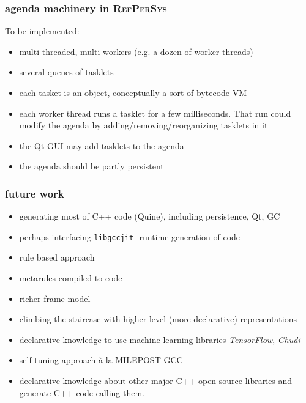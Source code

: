 \documentclass[xcolor=svgnames,final,smaller,a4]{beamer}
\newcommand{\RefPerSys}{\href{http://refpersys.org}{\textsc{RefPerSys}}}
\begin{document}
  \begin{frame}
    \frametitle{agenda machinery in \RefPerSys}

    To be implemented:
    
    \begin{itemize}
    \item multi-threaded, multi-workers (e.g. a dozen of worker threads)
    \item several queues of tasklets
    \item each tasket is an object, conceptually a sort of bytecode VM
    \item each worker thread runs a tasklet for a few milliseconds. That run could modify the agenda by adding/removing/reorganizing tasklets in it
    \item the Qt GUI may add tasklets to the agenda
      \item the agenda should be partly persistent
    \end{itemize}
  \end{frame}

  \begin{frame}
    \frametitle{future work}
    \begin{itemize}
    \item generating most of C++ code (Quine), including persistence, Qt, GC
    \item perhaps interfacing \texttt{libgccjit}  -runtime generation of code
    \item rule based approach
    \item metarules compiled to code
    \item richer frame model
    \item climbing the staircase with higher-level (more declarative) representations
    \item declarative knowledge to use machine learning libraries
        \href{https://www.tensorflow.org/}{\textit{TensorFlow}},
        \href{http://gudhi.gforge.inria.fr/}{\textit{Ghudi}}
      \item self-tuning approach à la
        \href{https://en.wikipedia.org/wiki/MILEPOST\_GCC}{MILEPOST
          GCC}
      \item declarative knowledge about other major C++ open source libraries and generate C++ code calling them.
    \end{itemize}
  \end{frame}
 
\end{document}
